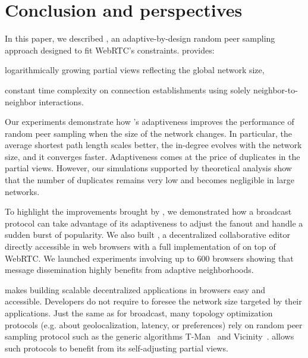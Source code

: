 
\section{Conclusion and perspectives}
\label{sec:conclusion}



In this paper, we described \SPRAY, an adaptive-by-design random peer sampling
approach designed to fit WebRTC's constraints.  \SPRAY provides:
\begin{inparaenum}[(i)]
\item logarithmically growing partial views reflecting the global network size,
\item constant time complexity on connection establishments using solely
  neighbor-to-neighbor interactions.
\end{inparaenum}
Our experiments demonstrate how \SPRAY's adaptiveness improves the performance
of random peer sampling when the size of the network changes. In particular, the
average shortest path length scales better, the in-degree evolves with the
network size, and it converges faster.  Adaptiveness comes at the price of
duplicates in the partial views. However, our simulations supported by
theoretical analysis show that the number of duplicates remains very low and
becomes negligible in large networks.

To highlight the improvements brought by \SPRAY, we demonstrated how a
broadcast protocol can take advantage of its adaptiveness to adjust
the fanout and handle a sudden burst of popularity. We also built
\CRATE, a decentralized collaborative editor directly accessible in
web browsers with a full implementation of \SPRAY on top of WebRTC. We
launched experiments involving up to 600 browsers showing that message
dissemination highly benefits from adaptive neighborhoods.

\SPRAY makes building scalable decentralized applications in browsers
easy and accessible.  Developers do not require to foresee the network
size targeted by their applications. Just the same as for broadcast,
many topology optimization protocols (e.g. about geolocalization,
latency, or preferences) rely on random peer sampling protocol such as
the generic algorithms T-Man~\cite{jelasity2009tman} and
Vicinity~\cite{voulgaris2005epidemic}. \SPRAY allows such protocols to
benefit from its self-adjusting partial views.

